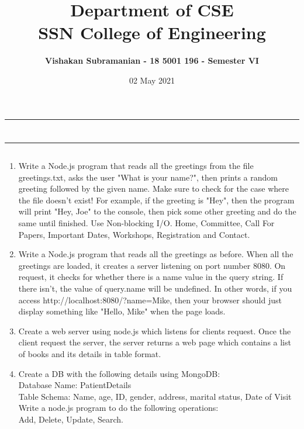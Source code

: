 \documentclass[12pt, a4]{article}
\title{\textbf{Department of CSE\\SSN College of Engineering}}
\author{\textbf{Vishakan Subramanian - 18 5001 196 - Semester VI}}
\date{02 May 2021}
\begin{document}
\maketitle
\hrule
\section*{}
\hrule
\bigskip

\subsection*{}
\subsection*{}
\begin{flushleft}

\begin{enumerate}
\item Write a Node.js program that reads all the greetings from the file
greetings.txt, asks the user "What is your name?", then prints a random
greeting followed by the given name. Make sure to check for the case where
the file doesn’t exist! For example, if the greeting is "Hey", then the program
will print "Hey, Joe" to the console, then pick some other greeting and do the
same until finished. Use Non-blocking I/O.
Home, Committee, Call For Papers, Important Dates, Workshops,
Registration and Contact.
\item Write a Node.js program that reads all the greetings as before. When all the greetings are loaded, it creates a server listening on port number 8080. On
request, it checks for whether there is a name value in the query string. If
there isn’t, the value of query.name will be undefined. In other words, if you access http://localhost:8080/?name=Mike, then your browser should just display something like "Hello, Mike" when the page loads.
\newpage
\item Create a web server using node.js which listens for clients request. Once the client request the server, the server returns a web page which contains a list of books and its details in table format.
\item Create a DB with the following details using MongoDB:
\\Database Name: PatientDetails
\\Table Schema: Name, age, ID, gender, address, marital status, Date of Visit
\\Write a node.js program to do the following operations:
\\Add, Delete, Update, Search.
\end{enumerate}



\end{flushleft}
\end{document}
